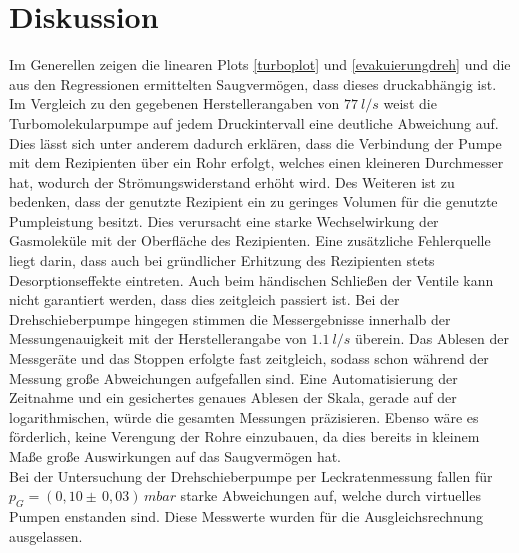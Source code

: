 \section{Diskussion}
Im Generellen zeigen die linearen Plots \ref{turboplot} und \ref{evakuierungdreh} und die aus den Regressionen ermittelten Saugvermögen,
dass dieses druckabhängig ist.
Im Vergleich zu den gegebenen Herstellerangaben von $\SI{77}{l/s}$ weist die Turbomolekularpumpe auf jedem Druckintervall eine deutliche Abweichung auf.
Dies lässt sich unter anderem dadurch erklären, dass die Verbindung der Pumpe mit dem Rezipienten über ein Rohr erfolgt, welches einen kleineren Durchmesser hat, wodurch der Strömungswiderstand erhöht wird.
Des Weiteren ist zu bedenken, dass der genutzte Rezipient ein zu geringes Volumen für die genutzte Pumpleistung besitzt. Dies verursacht eine starke Wechselwirkung der Gasmoleküle mit der Oberfläche des Rezipienten.
Eine zusätzliche Fehlerquelle liegt darin, dass auch bei gründlicher Erhitzung des Rezipienten stets Desorptionseffekte eintreten.
Auch beim händischen Schließen der Ventile kann nicht garantiert werden, dass dies zeitgleich passiert ist.
Bei der Drehschieberpumpe hingegen stimmen die Messergebnisse innerhalb der Messungenauigkeit mit der Herstellerangabe von $\SI{1,1}{l/s}$ überein.
Das Ablesen der Messgeräte und das Stoppen erfolgte fast zeitgleich, sodass schon während der Messung große Abweichungen aufgefallen sind.
Eine Automatisierung der Zeitnahme und ein gesichertes genaues Ablesen der Skala, gerade auf der logarithmischen, würde die gesamten Messungen präzisieren.
Ebenso wäre es förderlich, keine Verengung der Rohre einzubauen, da dies bereits in kleinem Maße große Auswirkungen auf das Saugvermögen hat.\\
Bei der Untersuchung der Drehschieberpumpe per Leckratenmessung fallen für $p_G=(0,10 \pm \, 0,03) \, \si{mbar}$ starke Abweichungen auf, welche durch virtuelles Pumpen enstanden sind. Diese Messwerte wurden für
die Ausgleichsrechnung ausgelassen.
